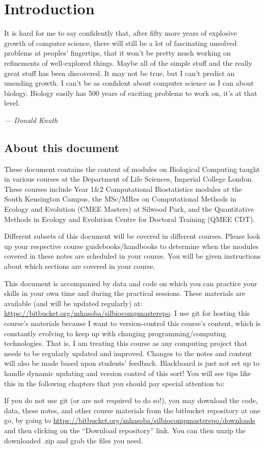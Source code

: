 \chapter{Introduction}
\label{chap:Intro}

\epigraph{It is hard for me to say confidently that, after fifty more 
years of explosive growth of computer science, there will still be a 
lot of fascinating unsolved problems at peoples' fingertips, that it 
won't be pretty much working on refinements of well-explored things. 
Maybe all of the simple stuff and the really great stuff has been 
discovered. It may not be true, but I can't predict an unending growth. 
I can't be as confident about computer science as I can about biology. 
Biology easily has 500 years of exciting problems to work on, it's at 
that level.}{\textit{--- Donald Knuth}}

\section{About this document} 

These document contains the content of modules on Biological Computing 
taught in various courses at the Department of Life Sciences, Imperial 
College London. These courses include Year 1\&2 Computational 
Biostatistics modules at the South Kensington Campus, the MSc/MRes 
on Computational Methods in Ecology and Evolution (CMEE Masters) at Silwood 
Park, and the Quantitative Methods in Ecology and Evolution Centre for 
Doctoral Training (QMEE CDT).

Different subsets of this document will be covered in different 
courses. Please look up your respective course guidebooks/handbooks to determine when the 
modules covered in these notes are scheduled in your course. 
You will be given instructions about which sections are covered in your 
course. 

This document is accompanied by data and code on which you can practice 
your skills in your own time and during the practical sessions. These 
materials are available (and will be updated regularly) at: 
\url{https://bitbucket.org/mhasoba/silbiocompmasterepo}. 
I use git for hosting this course's materials because I want to 
version-control this course's content, which is constantly evolving to 
keep up with changing programming/computing technologies. That is, I am treating 
this course as any computing 
project that needs to be regularly updated and improved. Changes to the 
notes and content will also be made based upon students' feedback. 
Blackboard is just not set up to handle dynamic updating and version 
control of this sort! You will see tips like this in the following 
chapters that you should pay special attention to:
\begin{tipbox}
If you do not use git (or are not required to do so!), you may download 
the code, data, these notes, and other course materials from the 
bitbucket repository at one go, by going to 
\url{https://bitbucket.org/mhasoba/silbiocompmasterepo/downloads} and 
then clicking on the ``Download repository'' link. You can then unzip 
the downloaded .zip and grab the files you need. 
\end{tipbox}

